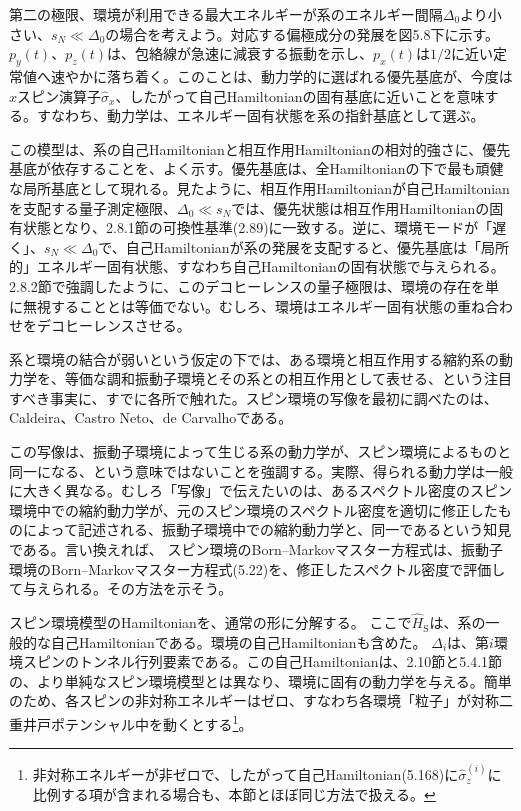 第二の極限、環境が利用できる最大エネルギーが系のエネルギー間隔$\Delta_0$より小さい、$s_N\ll\Delta_0$の場合を考えよう。対応する偏極成分の発展を図5.8下に示す。$p_y(t)$、$p_z(t)$は、包絡線が急速に減衰する振動を示し、$p_x(t)$は$1/2$に近い定常値へ速やかに落ち着く。このことは、動力学的に選ばれる優先基底が、今度は$x$スピン演算子$\hat\sigma_x$、したがって自己Hamiltonianの固有基底に近いことを意味する。すなわち、動力学は、エネルギー固有状態を系の指針基底として選ぶ。

この模型は、系の自己Hamiltonianと相互作用Hamiltonianの相対的強さに、優先基底が依存することを、よく示す。優先基底は、全Hamiltonianの下で最も頑健な局所基底として現れる。見たように、相互作用Hamiltonianが自己Hamiltonianを支配する量子測定極限、$\Delta_0\ll s_N$では、優先状態は相互作用Hamiltonianの固有状態となり、2.8.1節の可換性基準(2.89)に一致する。逆に、環境モードが「遅く」、$s_N\ll\Delta_0$で、自己Hamiltonianが系の発展を支配すると、優先基底は「局所的」エネルギー固有状態、すなわち自己Hamiltonianの固有状態で与えられる。2.8.2節で強調したように、このデコヒーレンスの量子極限\cite{ref103}は、環境の存在を単に無視することとは等価でない。むしろ、環境はエネルギー固有状態の重ね合わせをデコヒーレンスさせる。

系と環境の結合が弱いという仮定の下では、ある環境と相互作用する縮約系の動力学を、等価な調和振動子環境とその系との相互作用として表せる、という注目すべき事実に、すでに各所で触れた\cite{ref211,ref212}。スピン環境の写像を最初に調べたのは、Caldeira、Castro Neto、de Carvalho\cite{ref208}である。

この写像は、振動子環境によって生じる系の動力学が、スピン環境によるものと同一になる、という意味ではないことを強調する。実際、得られる動力学は一般に大きく異なる。むしろ「写像」で伝えたいのは、あるスペクトル密度のスピン環境中での縮約動力学が、元のスピン環境のスペクトル密度を適切に修正したものによって記述される、振動子環境中での縮約動力学と、同一であるという知見である。言い換えれば、
\hypertarget{srcpage:229}{}\label{srcpage:229}
スピン環境のBorn--Markovマスター方程式は、振動子環境のBorn--Markovマスター方程式(5.22)を、修正したスペクトル密度で評価して与えられる。その方法を示そう。

スピン環境模型のHamiltonianを、通常の形に分解する。
ここで$\hat H_{\mathrm S}$は、系の一般的な自己Hamiltonianである。環境の自己Hamiltonianも含めた。
$\Delta_i$は、第$i$環境スピンのトンネル行列要素である。この自己Hamiltonianは、2.10節と5.4.1節の、より単純なスピン環境模型とは異なり、環境に固有の動力学を与える。簡単のため、各スピンの非対称エネルギーはゼロ、すなわち各環境「粒子」が対称二重井戸ポテンシャル中を動くとする\footnote{非対称エネルギーが非ゼロで、したがって自己Hamiltonian(5.168)に$\hat\sigma_z^{(i)}$に比例する項が含まれる場合も、本節とほぼ同じ方法で扱える\cite{ref242}。}。

